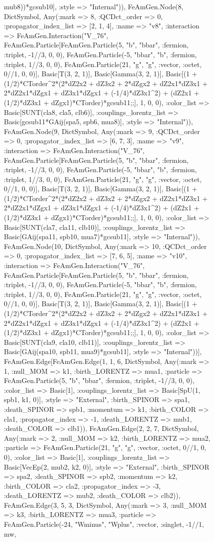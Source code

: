 \documentclass{revtex4}
\begin{document}
\begin{figure}[!htb]
\begin{center}
{mub8))*gcsub10], :style => "Internal")), FeAmGen.Node(8, Dict{Symbol, Any}(:mark => 8, :QCDct_order => 0, :propagator_index_list => [2, 1, 4], :name => "v8", :interaction => FeAmGen.Interaction("V_76", FeAmGen.Particle[FeAmGen.Particle(5, "b", "bbar", :fermion, :triplet, -1//3, 0, 0), FeAmGen.Particle(-5, "bbar", "b", :fermion, :triplet, 1//3, 0, 0), FeAmGen.Particle(21, "g", "g", :vector, :octet, 0//1, 0, 0)], Basic[T(3, 2, 1)], Basic[Gamma(3, 2, 1)], Basic[(1 + (1/2)*CTorder^2*(2*dZ2x2 + dZ3x2 + 2*dZgx2 + dZ2x1*dZ3x1 + 2*dZ2x1*dZgx1 + dZ3x1*dZgx1 + (-1/4)*dZ3x1^2) + (dZ2x1 + (1/2)*dZ3x1 + dZgx1)*CTorder)*gcsub11;;], 1, 0, 0), :color_list => Basic[SUNT(cla8, cla5, clb6)], :couplings_lorentz_list => Basic[gcsub11*GAij(spa5, spb6, mua8)], :style => "Internal")), FeAmGen.Node(9, Dict{Symbol, Any}(:mark => 9, :QCDct_order => 0, :propagator_index_list => [6, 7, 3], :name => "v9", :interaction => FeAmGen.Interaction("V_76", FeAmGen.Particle[FeAmGen.Particle(5, "b", "bbar", :fermion, :triplet, -1//3, 0, 0), FeAmGen.Particle(-5, "bbar", "b", :fermion, :triplet, 1//3, 0, 0), FeAmGen.Particle(21, "g", "g", :vector, :octet, 0//1, 0, 0)], Basic[T(3, 2, 1)], Basic[Gamma(3, 2, 1)], Basic[(1 + (1/2)*CTorder^2*(2*dZ2x2 + dZ3x2 + 2*dZgx2 + dZ2x1*dZ3x1 + 2*dZ2x1*dZgx1 + dZ3x1*dZgx1 + (-1/4)*dZ3x1^2) + (dZ2x1 + (1/2)*dZ3x1 + dZgx1)*CTorder)*gcsub11;;], 1, 0, 0), :color_list => Basic[SUNT(cla7, cla11, clb10)], :couplings_lorentz_list => Basic[GAij(spa11, spb10, mua7)*gcsub11], :style => "Internal")), FeAmGen.Node(10, Dict{Symbol, Any}(:mark => 10, :QCDct_order => 0, :propagator_index_list => [7, 6, 5], :name => "v10", :interaction => FeAmGen.Interaction("V_76", FeAmGen.Particle[FeAmGen.Particle(5, "b", "bbar", :fermion, :triplet, -1//3, 0, 0), FeAmGen.Particle(-5, "bbar", "b", :fermion, :triplet, 1//3, 0, 0), FeAmGen.Particle(21, "g", "g", :vector, :octet, 0//1, 0, 0)], Basic[T(3, 2, 1)], Basic[Gamma(3, 2, 1)], Basic[(1 + (1/2)*CTorder^2*(2*dZ2x2 + dZ3x2 + 2*dZgx2 + dZ2x1*dZ3x1 + 2*dZ2x1*dZgx1 + dZ3x1*dZgx1 + (-1/4)*dZ3x1^2) + (dZ2x1 + (1/2)*dZ3x1 + dZgx1)*CTorder)*gcsub11;;], 1, 0, 0), :color_list => Basic[SUNT(cla9, cla10, clb11)], :couplings_lorentz_list => Basic[GAij(spa10, spb11, mua9)*gcsub11], :style => "Internal"))], FeAmGen.Edge[FeAmGen.Edge(1, 1, 6, Dict{Symbol, Any}(:mark => 1, :null_MOM => k1, :birth_LORENTZ => mua1, :particle => FeAmGen.Particle(5, "b", "bbar", :fermion, :triplet, -1//3, 0, 0), :color_list => Basic[1], :couplings_lorentz_list => Basic[SpU(1, spb1, k1, 0)], :style => "External", :birth_SPINOR => spa1, :death_SPINOR => spb1, :momentum => k1, :birth_COLOR => cla1, :propagator_index => -1, :death_LORENTZ => mub1, :death_COLOR => clb1)), FeAmGen.Edge(2, 2, 7, Dict{Symbol, Any}(:mark => 2, :null_MOM => k2, :birth_LORENTZ => mua2, :particle => FeAmGen.Particle(21, "g", "g", :vector, :octet, 0//1, 0, 0), :color_list => Basic[1], :couplings_lorentz_list => Basic[VecEp(2, mub2, k2, 0)], :style => "External", :birth_SPINOR => spa2, :death_SPINOR => spb2, :momentum => k2, :birth_COLOR => cla2, :propagator_index => -3, :death_LORENTZ => mub2, :death_COLOR => clb2)), FeAmGen.Edge(3, 5, 3, Dict{Symbol, Any}(:mark => 3, :null_MOM => k3, :birth_LORENTZ => mua3, :particle => FeAmGen.Particle(-24, "Wminus", "Wplus", :vector, :singlet, -1//1, mw, }
\end{center}
\end{figure}
\end{document}
